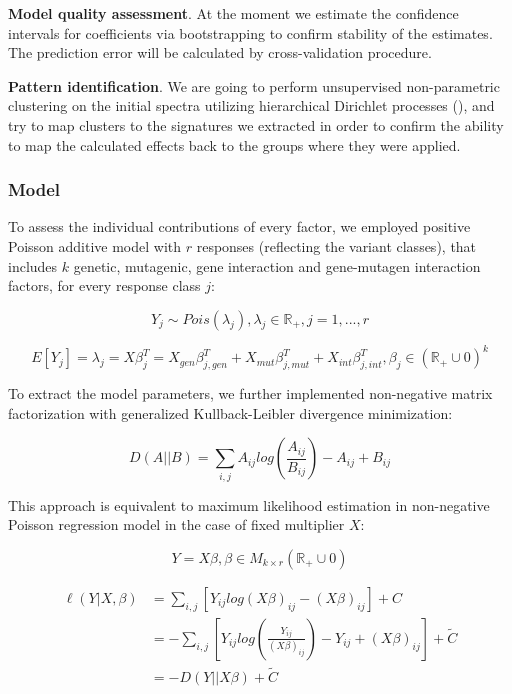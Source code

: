 \textbf{Model quality assessment}. At the moment we estimate the confidence intervals for coefficients via bootstrapping to confirm stability of the estimates. The prediction error will be calculated by cross-validation procedure.

\textbf{Pattern identification}. We are going to perform unsupervised non-parametric clustering on the initial spectra utilizing hierarchical Dirichlet processes (\cite{Teh}), and try to map clusters to the signatures we extracted in order to confirm the ability to map the calculated effects back to the groups where they were applied.

\subsubsection*{Model}

To assess the individual contributions of every factor, we employed positive Poisson additive model with $r$ responses (reflecting the variant classes), that includes $k$ genetic, mutagenic, gene interaction and gene-mutagen interaction factors, for every response class $j$:

\[Y_{j} \sim Pois(\lambda_{j}), \lambda_{j} \in  \mathbb{R}_{+} , j = 1, ..., r\]

\begin{equation}
E[Y_j] = \lambda_j = X \beta_{j}^{T} = X_{gen} \beta_{j,gen}^T + X_{mut} \beta_{j,mut}^T + X_{int} \beta_{j,int}^T, \beta_j \in (\mathbb{R}_{+} \cup {0})^k
\end{equation}

To extract the model parameters, we further implemented non-negative matrix factorization with generalized Kullback-Leibler divergence minimization:

\[D(A||B) = \sum_{i,j} A_{ij} log(\frac{A_{ij}}{B_{ij}} ) - A_{ij} + B_{ij}\]

This approach is equivalent to maximum likelihood estimation in non-negative Poisson regression model in the case of fixed multiplier $X$: 

\[Y = X \beta, \beta \in M_{k \times r} (\mathbb{R}_{+} \cup {0})\]

\begin{equation}
\begin{split}
\ell(Y|X,\beta) &= \sum_{i,j} \left[Y_{ij}  log⁡(X \beta)_{ij} - (X \beta)_{ij} \right] + C \\
&= - \sum_{i,j} \left[Y_{ij}  log⁡ \left( \frac{Y_{ij}}{(X\beta)_{ij}} \right) - Y_{ij} + (X\beta)_{ij} \right] + \tilde{C} \\ 
&= - D(Y||X\beta) + \tilde{C}
\end{split}
\end{equation}

